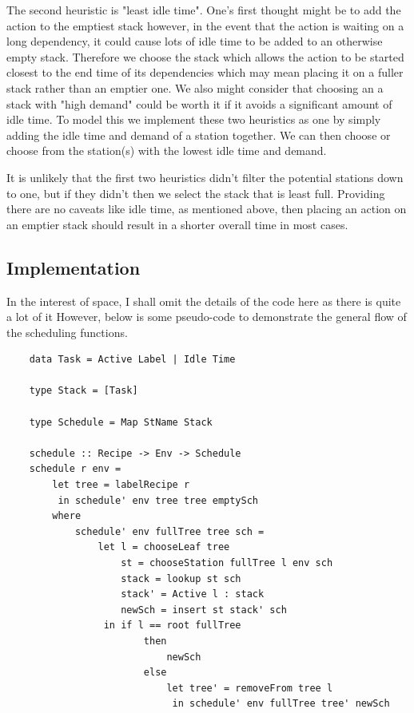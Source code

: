 \documentclass[11pt]{article}
\begin{document}
\medbreak

The second heuristic is "least idle time". One's first thought might be to add the action to the emptiest
stack however, in the event that the action is waiting on a long dependency, it could cause lots of idle
time to be added to an otherwise empty stack. Therefore we choose the stack which allows the action to be
started closest to the end time of its dependencies which may mean placing it on a fuller stack rather than
an emptier one. We also might consider that choosing an a stack with "high demand" could be worth it if
it avoids a significant amount of idle time. To model this we implement these two heuristics as one by
simply adding the idle time and demand of a station together. We can then choose or choose from the
station(s) with the lowest idle time and demand.

\medbreak

It is unlikely that the first two heuristics didn't filter the potential stations down to one, but if they
didn't then we select the stack that is least full. Providing there are no caveats like idle time, as mentioned
above, then placing an action on an emptier stack should result in a shorter overall time in most cases.

\subsection{Implementation}

In the interest of space, I shall omit the details of the code here as there is quite a lot of it
However, below is some pseudo-code to demonstrate the general flow of the scheduling functions.

\begin{lstlisting}
    data Task = Active Label | Idle Time

    type Stack = [Task]

    type Schedule = Map StName Stack

    schedule :: Recipe -> Env -> Schedule
    schedule r env =
        let tree = labelRecipe r
         in schedule' env tree tree emptySch
        where
            schedule' env fullTree tree sch =
                let l = chooseLeaf tree
                    st = chooseStation fullTree l env sch
                    stack = lookup st sch
                    stack' = Active l : stack
                    newSch = insert st stack' sch
                 in if l == root fullTree
                        then
                            newSch
                        else
                            let tree' = removeFrom tree l
                             in schedule' env fullTree tree' newSch
\end{lstlisting}
\end{document}
